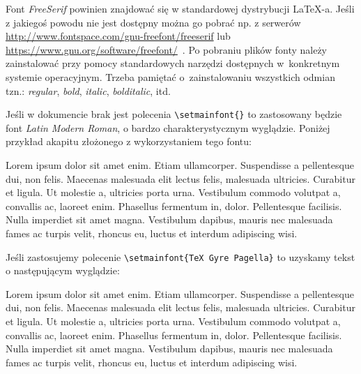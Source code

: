 \noindent Font \textit{FreeSerif} powinien znajdować się w standardowej dystrybucji  {\LaTeX}-a. Jeśli z jakiegoś powodu nie jest dostępny można go pobrać np. z serwerów \url{http://www.fontspace.com/gnu-freefont/freeserif} lub \url{https://www.gnu.org/software/freefont/}\ . Po pobraniu plików fonty należy zainstalować  przy pomocy standardowych narzędzi dostępnych w~konkretnym systemie operacyjnym. Trzeba pamiętać o~zainstalowaniu wszystkich odmian tzn.: \textit{regular}, \textit{bold}, \textit{italic}, \textit{bolditalic}, itd. 

Jeśli w dokumencie brak jest polecenia \texttt{\textbackslash setmainfont\{\}} to zastosowany będzie font \textit{Latin Modern Roman}, o bardzo charakterystycznym wyglądzie. Poniżej przykład akapitu złożonego z wykorzystaniem tego fontu:

\vskip18pt
\noindent\parbox{\textwidth}{
\setmainfont{Latin Modern Roman}
Lorem ipsum dolor sit amet enim. Etiam ullamcorper. Suspendisse a pellentesque dui, non felis. Maecenas malesuada elit lectus felis, malesuada ultricies. Curabitur et ligula. Ut molestie a, ultricies porta urna. Vestibulum commodo volutpat a, convallis ac, laoreet enim. Phasellus fermentum in, dolor. Pellentesque facilisis. Nulla imperdiet sit amet magna. Vestibulum dapibus, mauris nec malesuada fames ac turpis velit, rhoncus eu, luctus et interdum adipiscing wisi. }
\vskip18pt
\noindent Jeśli zastosujemy polecenie \texttt{\textbackslash setmainfont\{TeX Gyre Pagella\}} to uzyskamy tekst o następującym wyglądzie:
\vskip18pt
\noindent\parbox{\textwidth}{
\setmainfont{TeX Gyre Pagella}
Lorem ipsum dolor sit amet enim. Etiam ullamcorper. Suspendisse a pellentesque dui, non felis. Maecenas malesuada elit lectus felis, malesuada ultricies. Curabitur et ligula. Ut molestie a, ultricies porta urna. Vestibulum commodo volutpat a, convallis ac, laoreet enim. Phasellus fermentum in, dolor. Pellentesque facilisis. Nulla imperdiet sit amet magna. Vestibulum dapibus, mauris nec malesuada fames ac turpis velit, rhoncus eu, luctus et interdum adipiscing wisi.}\label{fonty}

\vskip18pt


